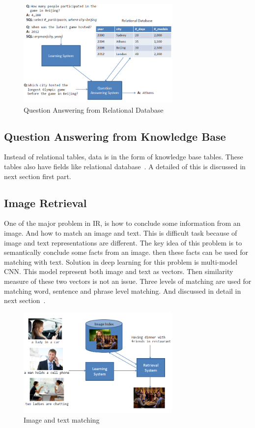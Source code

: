 \documentclass{doublecol-new}
\theoremstyle{TH}{
\newtheorem{lemma}{Lemma}
\newtheorem{theorem}[lemma]{Theorem}
\newtheorem{corrolary}[lemma]{Corrolary}
\newtheorem{conjecture}[lemma]{Conjecture}
\newtheorem{proposition}[lemma]{Proposition}
\newtheorem{claim}[lemma]{Claim}
\newtheorem{stheorem}[lemma]{Wrong Theorem}
\newtheorem{algorithm}{Algorithm}
}
\theoremstyle{THrm}{
\newtheorem{definition}{Definition}[section]
\newtheorem{question}{Question}[section]
\newtheorem{remark}{Remark}
\newtheorem{scheme}{Scheme}
}
\theoremstyle{THhit}{
\newtheorem{case}{Case}[section]
}
\begin{document}
\begin{figure}[h]
	\centerline{\includegraphics[width=8cm,keepaspectratio]{image/relational-QA.PNG}}
	\label{fig:Question Answering from Relational Database}
	\caption{Question Answering from Relational Database}
\end{figure}
\subsection{Question Answering from Knowledge Base}

Instead of relational tables, data is in the form of knowledge base tables. These tables also have fields like relational database~\cite{yin2015neural}. A detailed of this is discussed in next section first part. 
\subsection{Image Retrieval}

One of the major problem in IR, is how to conclude some information from an image. And how to match an image and text. This is difficult task because of image and text representations are different. The key idea of this problem is to semantically conclude some facts from an image. then these facts can be used for matching with text. Solution in deep learning for this problem is multi-model CNN. This model represent both image and text as vectors. Then similarity measure of these two vectors is not an issue. Three levels of matching are used for matching word, sentence and phrase level matching. And discussed in detail in next section~\cite{ma2015multimodal}. 

\begin{figure}[h]
	\centerline{\includegraphics[width=8cm,keepaspectratio]{image/image-retrival.PNG}}
	\label{fig:Image and text matching}
	\caption{Image and text matching}
\end{figure}
\end{document}
